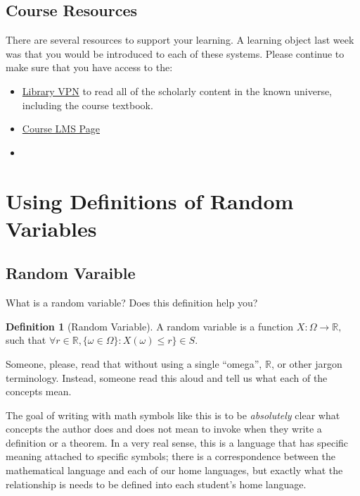 \documentclass[
]{book}
\providecommand{\tightlist}{%
  \setlength{\itemsep}{0pt}\setlength{\parskip}{0pt}}
\theoremstyle{definition}
\newtheorem{definition}{Definition}[chapter]
\theoremstyle{definition}
\theoremstyle{definition}
\theoremstyle{definition}
\theoremstyle{remark}
\begin{document}
\hypertarget{course-resources}{%
\subsection{Course Resources}\label{course-resources}}

There are several resources to support your learning. A learning object last week was that you would be introduced to each of these systems. Please continue to make sure that you have access to the:

\begin{itemize}
\tightlist
\item
  \href{https://www.lib.berkeley.edu/using-the-libraries/vpn}{Library VPN} to read all of the scholarly content in the known universe, including the course textbook.
\item
  \href{https://www.learn.datascience.berkeley.edu}{Course LMS Page}
\item
\end{itemize}

\hypertarget{using-definitions-of-random-variables}{%
\section{Using Definitions of Random Variables}\label{using-definitions-of-random-variables}}

\hypertarget{random-varaible}{%
\subsection{Random Varaible}\label{random-varaible}}

What is a random variable? Does this definition help you?

\begin{definition}[Random Variable]
A random variable is a function \(X : \Omega \rightarrow \mathbb{R},\) such that \(\forall r \in \mathbb{R}, \{\omega \in \Omega\}: X(\omega) \leq r\} \in S\).
\end{definition}

Someone, please, read that without using a single ``omega'', \(\mathbb{R}\), or other jargon terminology. Instead, someone read this aloud and tell us what each of the concepts mean.

The goal of writing with math symbols like this is to be \emph{absolutely} clear what concepts the author does and does not mean to invoke when they write a definition or a theorem. In a very real sense, this is a language that has specific meaning attached to specific symbols; there is a correspondence between the mathematical language and each of our home languages, but exactly what the relationship is needs to be defined into each student's home language.
\end{document}
